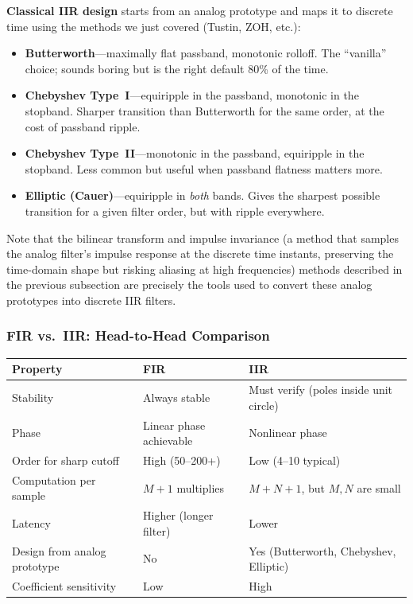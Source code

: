 \textbf{Classical IIR design} starts from an analog prototype and maps it to
discrete time using the methods we just covered (Tustin, ZOH, etc.):
\begin{itemize}
    \item \textbf{Butterworth}---maximally flat passband, monotonic rolloff. The
          ``vanilla'' choice; sounds boring but is the right default 80\% of the time.
    \item \textbf{Chebyshev Type~I}---equiripple in the passband, monotonic in the
          stopband. Sharper transition than Butterworth for the same order, at the
          cost of passband ripple.
    \item \textbf{Chebyshev Type~II}---monotonic in the passband, equiripple in the
          stopband. Less common but useful when passband flatness matters more.
    \item \textbf{Elliptic (Cauer)}---equiripple in \textit{both} bands. Gives the
          sharpest possible transition for a given filter order, but with ripple
          everywhere.
\end{itemize}

Note that the bilinear transform and impulse invariance (a method that samples the analog filter's impulse response at the discrete time instants, preserving the time-domain shape but risking aliasing at high frequencies) methods described in the
previous subsection are precisely the tools used to convert these analog prototypes
into discrete IIR filters.

\subsubsection{FIR vs.\ IIR: Head-to-Head Comparison}

\begin{center}
\begin{tabular}{lll}
\toprule
\textbf{Property} & \textbf{FIR} & \textbf{IIR} \\
\midrule
Stability & Always stable & Must verify (poles inside unit circle) \\
Phase & Linear phase achievable & Nonlinear phase \\
Order for sharp cutoff & High (50--200+) & Low (4--10 typical) \\
Computation per sample & $M+1$ multiplies & $M+N+1$, but $M,N$ are small \\
Latency & Higher (longer filter) & Lower \\
Design from analog prototype & No & Yes (Butterworth, Chebyshev, Elliptic) \\
Coefficient sensitivity & Low & High \\
\bottomrule
\end{tabular}
\end{center}

